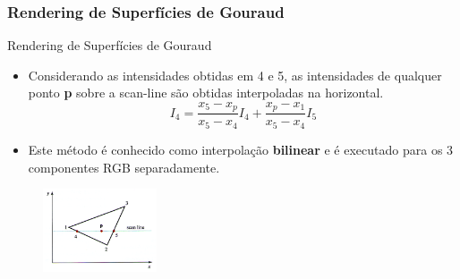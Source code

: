 \documentclass{beamer}
\begin{document}
\begin{frame}
\frametitle{Rendering de Superfícies de Gouraud}

		\begin{block}{Rendering de Superfícies de Gouraud}
		\begin{itemize}
			\item Considerando as intensidades obtidas em 4 e 5, as intensidades de qualquer ponto \textbf{p} sobre a scan-line são obtidas interpoladas na horizontal. 
			\begin{equation*}
				I_4 = \frac{x_5-x_p}{x_5-x_4} I_4 + \frac{x_p-x_1}{x_5-x_4}I_5
			\end{equation*}
			\item Este método é conhecido como interpolação \textbf{bilinear} e é executado para os 3 componentes RGB separadamente.
			\end{itemize}
	\end{block}
	
	\begin{figure}[!h]
			\begin{center}
			\includegraphics[width=0.3\textwidth]{Figures/Int1}
			\end{center}
		\end{figure}
	
\end{frame}
\end{document}
